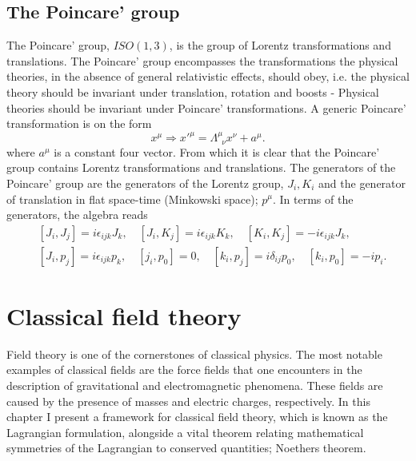 \section{The Poincare' group}
The Poincare' group, $ISO(1,3)$, is the group of Lorentz transformations and translations. The Poincare' group encompasses the transformations the physical theories, in the absence of general relativistic effects, should obey, i.e. the physical theory should be invariant under translation, rotation and boosts - Physical theories should be invariant under Poincare' transformations. A generic Poincare' transformation is on the form
\begin{equation}
	x^\mu\Rightarrow {x'}^\mu=\Lambda^{\mu}_{\,\,\, \nu}x^\nu+a^{\mu}.
\end{equation}  
where $a^\mu$ is a constant four vector. From which it is clear that the Poincare' group contains Lorentz transformations and translations. The generators of the Poincare' group are the generators of the Lorentz group, $J_i,K_i$ and the generator of translation in flat space-time (Minkowski space); $p^\mu$. In terms of the generators, the algebra reads
\begin{equation}
	\begin{split}
		&[J_i,J_j]=i\epsilon_{ijk}J_k, \quad [J_i,K_j]=i \epsilon_{ijk}K_k, \quad [K_i,K_j]=-i\epsilon_{ijk}J_k,\\
		&[J_i,p_j]=i\epsilon_{ijk}p_k,\quad [j_i,p_0]=0,\quad [k_i,p_j]=i\delta_{ij}p_0,\quad [k_i,p_0]=-ip_i.
	\end{split}
\end{equation} 


\chapter{Classical field theory}
Field theory is one of the cornerstones of classical physics. The most notable examples of classical fields are the force fields that one encounters in the description of gravitational and electromagnetic phenomena. These fields are caused by the presence of masses and electric charges, respectively. In this chapter I present a framework for classical field theory, which is known as the Lagrangian formulation, alongside a vital theorem relating mathematical symmetries of the Lagrangian to conserved quantities; Noethers theorem.

